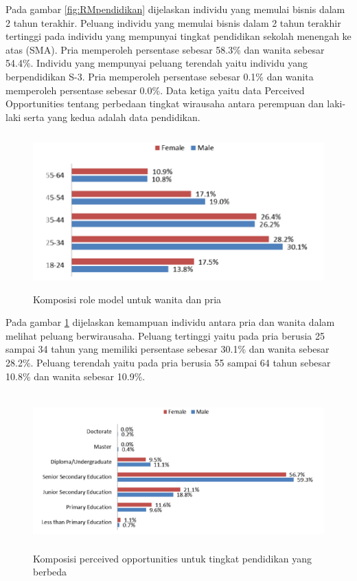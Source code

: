 \documentclass[a4paper,twoside]{article}
\begin{document}
\begin{enumerate}
Pada gambar \ref{fig:RMpendidikan} dijelaskan individu yang memulai bisnis dalam 2 tahun terakhir. Peluang individu yang memulai bisnis dalam 2 tahun terakhir tertinggi pada individu yang mempunyai tingkat pendidikan sekolah menengah ke atas (SMA). Pria memperoleh persentase sebesar 58.3\% dan wanita sebesar 54.4\%. Individu yang mempunyai peluang terendah yaitu individu yang berpendidikan S-3. Pria memperoleh persentase sebesar 0.1\% dan wanita memperoleh persentase sebesar 0.0\%. Data ketiga yaitu data Perceived Opportunities tentang perbedaan tingkat wirausaha antara perempuan dan laki-laki serta yang kedua adalah data pendidikan.

\begin{figure} [H]
	\centering  
	\includegraphics[width=12cm, height=6cm]{POfemalemale} 
	\caption[Komposisi role model untuk wanita dan pria]{Komposisi role model untuk wanita dan pria} 
	\label{fig:POfemalemale} 
\end{figure} 

Pada gambar \ref{fig:POfemalemale} dijelaskan kemampuan individu antara pria dan wanita dalam melihat peluang berwirausaha. Peluang tertinggi yaitu pada pria berusia 25 sampai 34 tahun yang memiliki persentase sebesar 30.1\% dan wanita sebesar 28.2\%. Peluang terendah yaitu pada pria berusia 55 sampai 64 tahun sebesar 10.8\% dan wanita sebesar 10.9\%. 

\begin{figure} [H]
	\centering  
	\includegraphics[width=14cm, height=6cm]{POpendidikan} 
	\caption[Komposisi perceived opportunities untuk tingkat pendidikan yang berbeda]{Komposisi perceived opportunities untuk tingkat pendidikan yang berbeda} 
	\label{fig:POpendidikan} 
\end{figure}  


\end{enumerate}
\end{document}
